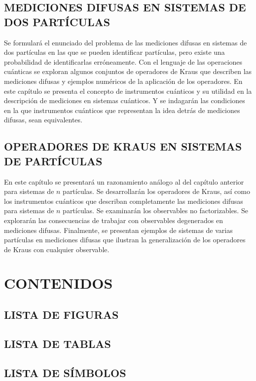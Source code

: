 \documentclass[12pt,oneside]{book}\raggedbottom{} %
\begin{document}
{{{\section{MEDICIONES DIFUSAS EN SISTEMAS DE DOS PARTÍCULAS}
Se formulará el enunciado del problema de las mediciones difusas en sistemas de
dos partículas en las que se pueden identificar partículas, pero existe una
probabilidad de identificarlas erróneamente. Con el lenguaje de las operaciones
cuánticas se exploran algunos conjuntos de operadores de Kraus que describen
las mediciones difusas y ejemplos numéricos de la aplicación de los operadores.
En este capítulo se presenta el concepto de instrumentos cuánticos y su
utilidad en la descripción de mediciones en sistemas cuánticos. Y se indagarán
las condiciones en la que instrumentos cuánticos que representan la idea detrás
de mediciones difusas, sean equivalentes.


\section{OPERADORES DE KRAUS EN SISTEMAS DE \texorpdfstring{}{n} PARTÍCULAS}

En este capítulo se presentará un razonamiento análogo al del capítulo
anterior para sistemas de $n$ partículas. Se  desarrollarán los operadores de
Kraus, así como los instrumentos cuánticos que describan completamente las
mediciones difusas para sistemas de $n$ partículas. Se examinarán los
observables no factorizables. Se explorarán las consecuencias de trabajar con
observables degenerados en mediciones difusas.  Finalmente, se presentan
ejemplos de sistemas de varias partículas en mediciones difusas que ilustran la
generalización de los operadores de Kraus con cualquier observable.  


\chapter{CONTENIDOS} %

\section*{LISTA DE FIGURAS}

\section*{LISTA DE TABLAS}

\section*{LISTA DE SÍMBOLOS}

}}}
\end{document}
